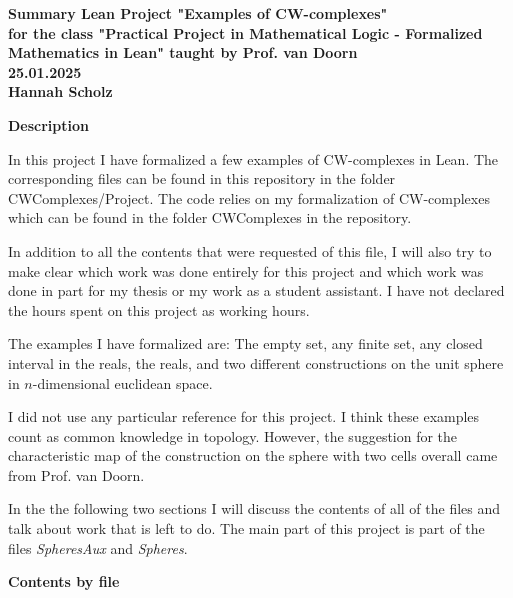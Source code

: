 \documentclass[11pt,a4paper]{article}
\begin{document}
\begin{minipage}{0.75\linewidth}
{
  \large \bfseries Summary Lean Project "Examples of CW-complexes"\\[0.5ex]
  \mdseries
  \normalsize for the class "Practical Project in Mathematical Logic - Formalized Mathematics in Lean" 
    taught by Prof. van Doorn \\[0.4ex]
  \normalsize 25.01.2025\\[0.4ex]
  \normalsize Hannah Scholz
}
\end{minipage}
\hfill
\begin{minipage}{0.25\linewidth}
\vspace{2mm}
\end{minipage}


\bigskip 
{\bf Description}

\medskip

In this project I have formalized a few examples of CW-complexes in Lean. 
The corresponding files can be found in this repository in the folder CWComplexes/Project.
The code relies on my formalization of CW-complexes which can be found in the folder CWComplexes in the repository.

In addition to all the contents that were requested of this file, I will also try to make clear
which work was done entirely for this project and which work was done in part for my thesis or my work as 
a student assistant. 
I have not declared the hours spent on this project as working hours. 

The examples I have formalized are: The empty set, any finite set, any closed interval in the reals, the reals, and 
two different constructions on the unit sphere in $n$-dimensional euclidean space. 

I did not use any particular reference for this project. I think these examples count as common knowledge in topology.
However, the suggestion for the characteristic map of the construction on the sphere with two cells overall 
came from Prof. van Doorn. 

In the the following two sections I will discuss the contents of all of the files and talk about work that is left to do.
The main part of this project is part of the files \emph{SpheresAux} and \emph{Spheres}.


\bigskip

{\bf Contents by file}

\medskip
\end{document}

